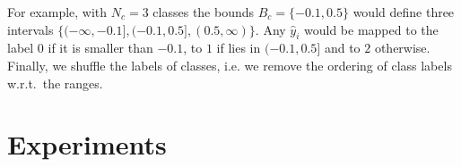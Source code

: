 \documentclass{article}
\begin{document}

For example, with $N_c = 3$ classes the bounds $B_c = \{-0.1, 0.5\}$ would define three intervals $\{(-\infty, -0.1], (-0.1, 0.5], (0.5, \infty)\}$. Any $\hat{y}_i$ would be mapped to the label $0$ if it is smaller than $-0.1$, to $1$ if lies in $(-0.1, 0.5]$ and to $2$ otherwise.
Finally, we shuffle the labels of classes, i.e. we remove the ordering of class labels w.r.t.\ the ranges.


\section{Experiments}\label{sec:experiments}
\end{document}
